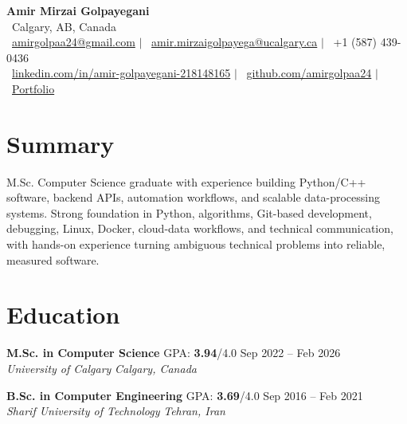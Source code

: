 \documentclass[a4paper,10pt]{article}
\newcommand{\resumeEducationSubheading}[5]{
    \textbf{#1} \hfill #2 \hfill #3 \\
    \textit{#4} \hfill \textit{#5}
}
\begin{document}

\begin{center}
    {\LARGE \textbf{Amir Mirzai Golpayegani}} \\[0.25em]
    \faMapMarker*~Calgary, AB, Canada \\[0.25em]
    \faEnvelope~\href{mailto:amirgolpaa24@gmail.com}{amirgolpaa24@gmail.com}
    $|$
    \faEnvelope~\href{mailto:amir.mirzaigolpayega@ucalgary.ca}{amir.mirzaigolpayega@ucalgary.ca}
    $|$
    \faPhone*~+1 (587) 439-0436 \\[0.25em]
    \faLinkedin~\href{https://linkedin.com/in/amir-golpayegani-218148165}{linkedin.com/in/amir-golpayegani-218148165}
    $|$
    \faGithub~\href{https://github.com/amirgolpaa24}{github.com/amirgolpaa24}
    $|$
    \faGlobe~\href{https://amir-portfolio-navy.vercel.app/}{Portfolio}
\end{center}


\section*{Summary}

M.Sc. Computer Science graduate with experience building Python/C++ software, backend APIs, automation workflows, and scalable data-processing systems. Strong foundation in Python, algorithms, Git-based development, debugging, Linux, Docker, cloud-data workflows, and technical communication, with hands-on experience turning ambiguous technical problems into reliable, measured software.


\section*{Education}

\resumeEducationSubheading
{M.Sc. in Computer Science}
{GPA: \textbf{3.94}/4.0}
{Sep 2022 -- Feb 2026}
{University of Calgary}
{Calgary, Canada}

\vspace{0.35em}

\resumeEducationSubheading
{B.Sc. in Computer Engineering}
{GPA: \textbf{3.69}/4.0}
{Sep 2016 -- Feb 2021}
{Sharif University of Technology}
{Tehran, Iran}

\end{document}
